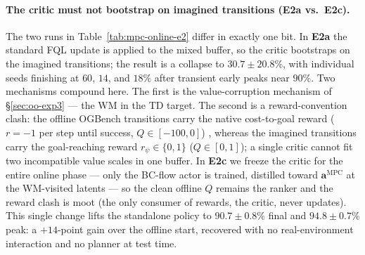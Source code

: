 \paragraph{The critic must not bootstrap on imagined transitions (E2a vs.\ E2c).} The two runs in Table~\ref{tab:mpc-online-e2} differ in exactly one bit. In \textbf{E2a} the standard FQL update is applied to the mixed buffer, so the critic bootstraps on the imagined transitions; the result is a collapse to $30.7 \pm 20.8\%$, with individual seeds finishing at $60$, $14$, and $18\%$ after transient early peaks near $90\%$. Two mechanisms compound here. The first is the value-corruption mechanism of \S\ref{sec:oo-exp3} --- the WM in the TD target. The second is a reward-convention clash: the offline OGBench transitions carry the native cost-to-goal reward ($r = -1$ per step until success, $Q \in [-100, 0]$) \cite{ogbench_park2025}, whereas the imagined transitions carry the goal-reaching reward $r_\psi \in \{0, 1\}$ ($Q \in [0, 1]$); a single critic cannot fit two incompatible value scales in one buffer. In \textbf{E2c} we freeze the critic for the entire online phase --- only the BC-flow actor is trained, distilled toward $\mathbf{a}^{\text{MPC}}$ at the WM-visited latents --- so the clean offline $Q$ remains the ranker and the reward clash is moot (the only consumer of rewards, the critic, never updates). This single change lifts the standalone policy to $90.7 \pm 0.8\%$ final and $94.8 \pm 0.7\%$ peak: a $+14$-point gain over the offline start, recovered with no real-environment interaction and no planner at test time.

